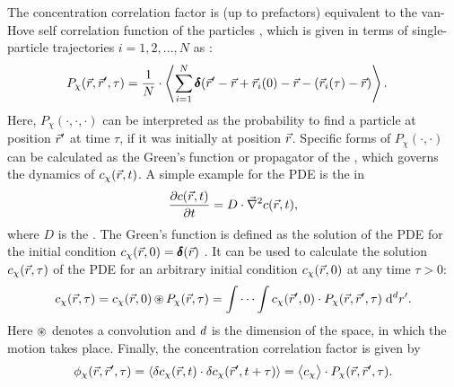 
The concentration correlation factor is (up to prefactors) equivalent to the van-Hove self correlation function of the particles \cite{HANSEN2013,HOPKIN2010,HOFLIN2013}, which is given in terms of single-particle trajectories $i=1,2,...,N$ as \cite{HOPKIN2010}:
\begin{align}\label{eq:fcs_vanhove_trajectory}
    P_\chi(\vec{r},\vec{r}',\tau)&=\frac{1}{N}\cdot\left\langle \sum\limits_{i=1}^N\pmb{\delta}(\vec{r}'-\vec{r}+\vec{r}_i(0)-\vec{r}-(\vec{r}_i(\tau)-\vec{r})\right\rangle.
\end{align}
Here, $P_\chi(\cdot,\cdot,\cdot)$ can be interpreted as the probability to find a particle at position $\vec{r}'$ at time $\tau$, if it was initially at position $\vec{r}$. Specific forms of $P_\chi(\cdot,\cdot)$ can be calculated as the Green's function or propagator of the , which governs the dynamics of $c_\chi(\vec{r},t)$. A simple example for the PDE is the  in 
  \begin{equation}\label{eq:intro_diffusion_dgl}  
    \frac{\partial c(\vec{r}, t)}{\partial t}= D\cdot \vec{\nabla}^2c(\vec{r}, t),
  \end{equation}
where $D$ is the .
The Green's function is defined as the solution of the PDE for the initial condition $c_\chi(\vec{r},0)=\pmb{\delta}(\vec{r})$ \cite{BOAS1983}. It can be used to calculate the solution $c_\chi(\vec{r},\tau)$ of the PDE for an arbitrary initial condition $c_\chi(\vec{r},0)$ at any time $\tau>0$:
\begin{equation}\label{eq:intro_diffusion_dgl_solution_greens}  
  c_\chi(\vec{r},\tau)=c_\chi(\vec{r},0)\operatorname{\circledast} P_\chi(\vec{r},\tau)=\idotsint c_\chi(\vec{r}',0)\cdot P_\chi(\vec{r},\vec{r}',\tau)\;\mathrm{d}^d r'.
\end{equation}
Here $\operatorname{\circledast}$ denotes a convolution and $d$ is the dimension of the space, in which the motion takes place. Finally, the concentration correlation factor is given by
\begin{equation}\label{eq:fcs_diffusion_vanHove_and_Propagator}  
  \phi_\chi(\vec{r},\vec{r}',\tau)=\left\langle \delta c_\chi(\vec{r},t)\cdot\delta c_\chi(\vec{r}',t+\tau)\right\rangle=\bigl\langle c_\chi\bigr\rangle\cdot P_\chi(\vec{r},\vec{r}',\tau).
\end{equation}


